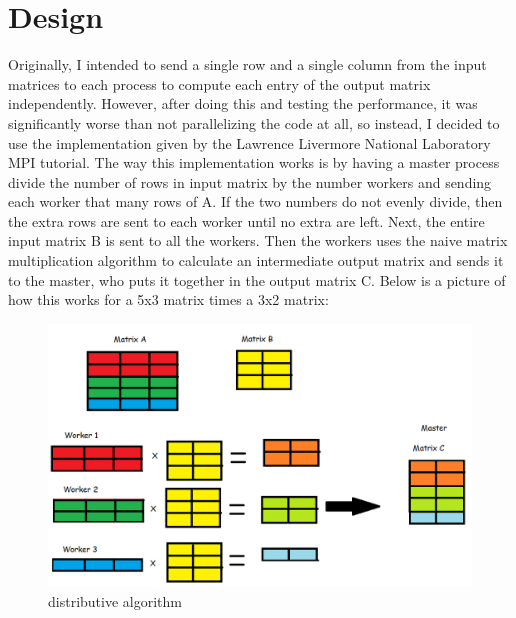 \documentclass[12pt]{report}
\begin{document}
\chapter{Design}
Originally, I intended to send a single row and a single column from the input matrices to each process to compute each entry of the output matrix independently.
However, after doing this and testing the performance, it was significantly worse than not parallelizing the code at all, so instead, I decided to use the implementation
given by the Lawrence Livermore National Laboratory MPI tutorial.\cite{llnl} The way this implementation works is by having a master process divide the number of rows
in input matrix by the number workers and sending each worker that many rows of A. 
If the two numbers do not evenly divide, then the extra rows are sent to each worker until no extra are left. Next, the entire input matrix B is sent to all the workers.
Then the workers uses the naive matrix multiplication algorithm to calculate an intermediate output matrix and sends it to the master, who puts it together in the output matrix C.
Below is a picture of how this works for a 5x3 matrix times a 3x2 matrix:

\begin{figure}[ht]
    \centering
    \includegraphics[scale=0.5]{algorithm}
    \caption{distributive algorithm}
\end{figure}
\end{document}
